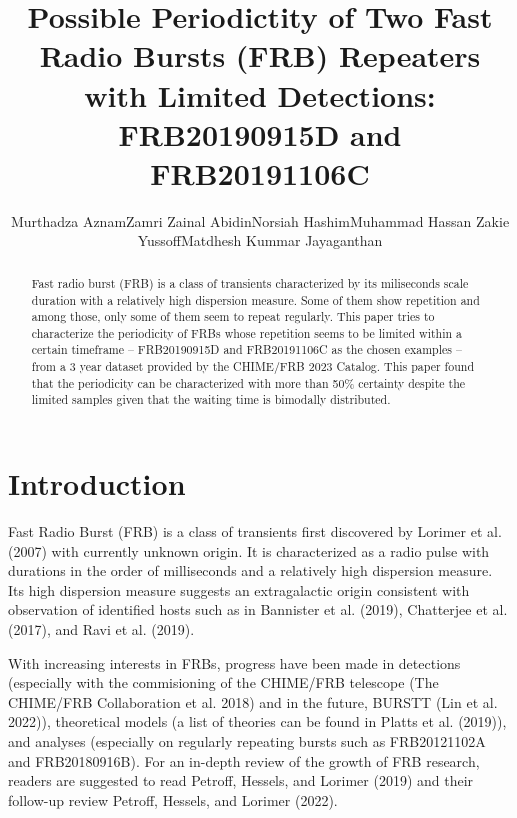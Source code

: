 \documentclass[
  rmp,
  amsmath,
  amssymb,
  preprint]{revtex4-2}
\title{Possible Periodictity of Two Fast Radio Bursts (FRB) Repeaters
with Limited Detections: FRB20190915D and FRB20191106C}
\date{}
\begin{document}
\begin{abstract}
    Fast radio burst (FRB) is a class of transients characterized by its
    miliseconds scale duration with a relatively high dispersion
    measure. Some of them show repetition and among those, only some of
    them seem to repeat regularly. This paper tries to characterize the
    periodicity of FRBs whose repetition seems to be limited within a
    certain timeframe -- FRB20190915D and FRB20191106C as the chosen
    examples -- from a 3 year dataset provided by the CHIME/FRB 2023
    Catalog. This paper found that the periodicity can be characterized
    with more than 50\% certainty despite the limited samples given that
    the waiting time is bimodally distributed.
\end{abstract}
\author{Murthadza AznamZamri Zainal AbidinNorsiah HashimMuhammad Hassan
Zakie YussoffMatdhesh Kummar Jayaganthan}
\maketitle
\ifdefined\Shaded\renewenvironment{Shaded}{\begin{tcolorbox}[frame hidden, boxrule=0pt, sharp corners, breakable, borderline west={3pt}{0pt}{shadecolor}, enhanced, interior hidden]}{\end{tcolorbox}}\fi

\hypertarget{introduction}{%
\section{Introduction}\label{introduction}}

Fast Radio Burst (FRB) is a class of transients first discovered by
Lorimer et al. (2007) with currently unknown origin. It is characterized
as a radio pulse with durations in the order of milliseconds and a
relatively high dispersion measure. Its high dispersion measure suggests
an extragalactic origin consistent with observation of identified hosts
such as in Bannister et al. (2019), Chatterjee et al. (2017), and Ravi
et al. (2019).

With increasing interests in FRBs, progress have been made in detections
(especially with the commisioning of the CHIME/FRB telescope (The
CHIME/FRB Collaboration et al. 2018) and in the future, BURSTT (Lin et
al. 2022)), theoretical models (a list of theories can be found in
Platts et al. (2019)), and analyses (especially on regularly repeating
bursts such as FRB20121102A and FRB20180916B). For an in-depth review of
the growth of FRB research, readers are suggested to read Petroff,
Hessels, and Lorimer (2019) and their follow-up review Petroff, Hessels,
and Lorimer (2022).
\end{document}
